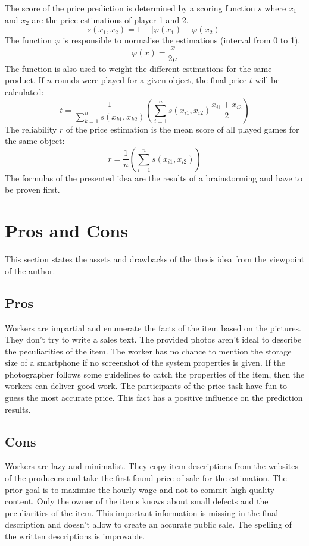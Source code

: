 The score of the price prediction is determined by a scoring function \( s \) where \( x_1 \) and \( x_2 \) are the price estimations of player 1 and 2.
\begin{equation}
s(x_1,x_2) = 1 - |\varphi(x_1) - \varphi(x_2)|
\end{equation}
The function \( \varphi \) is responsible to normalise the estimations (interval from 0 to 1).
\begin{equation}
\varphi(x) = \frac{x}{2\mu}
\end{equation}
The function is also used to weight the different estimations for the same product. If \( n \) rounds were played for a given object, the final price \( t \) will be calculated:
\begin{equation}
t = \frac{1}{\sum_{k=1}^{n} s(x_{k1},x_{k2})}\left(\sum_{i=1}^{n} s(x_{i1},x_{i2})\frac{x_{i1}+x_{i2}}{2}\right)
\end{equation}
The reliability \( r \) of the price estimation is the mean score of all played games for the same object:
\begin{equation}
r = \frac{1}{n}\left(\sum_{i=1}^{n} s(x_{i1},x_{i2})\right)
\end{equation}
The formulas of the presented idea are the results of a brainstorming and have to be proven first.
\section{Pros and Cons}
This section states the assets and drawbacks of the thesis idea from the viewpoint of the author.
\subsection{Pros}
Workers are impartial and enumerate the facts of the item based on the pictures. They don't try to write a sales text. The provided photos aren't ideal to describe the peculiarities of the item. The worker has no chance to mention the storage size of a smartphone if no screenshot of the system properties is given. If the photographer follows some guidelines to catch the properties of the item, then the workers can deliver good work. The participants of the price task have fun to guess the most accurate price. This fact has a positive influence on the prediction results. 
\subsection{Cons}
Workers are lazy and minimalist. They copy item descriptions from the websites of the producers and take the first found price of sale for the estimation. The prior goal is to maximise the hourly wage and not to commit high quality content. Only the owner of the items knows about small defects and the peculiarities of the item. This important information is missing in the final description and doesn't allow to create an accurate public sale. The spelling of the written descriptions is improvable.
